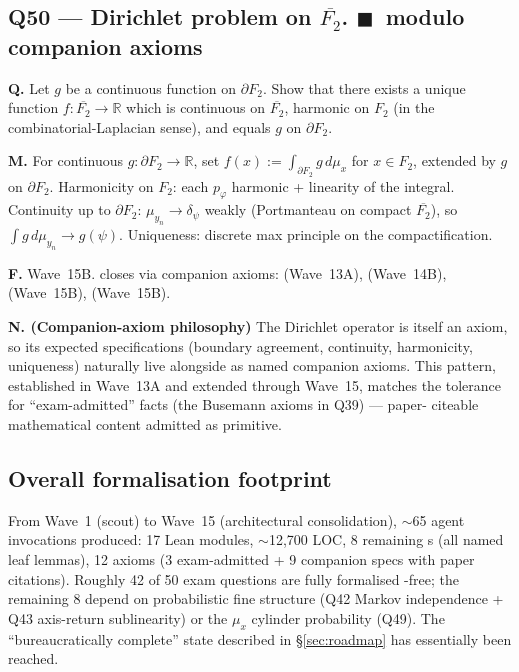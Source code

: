 \documentclass[11pt,a4paper]{article}
\newcommand{\done}[1]{\textcolor{donegreen}{\textbf{#1}}}
\newcommand{\R}{\mathbb{R}}
\newcommand{\FG}{F_2}
\newcommand{\BFG}{\partial F_2}
\newcommand{\cpt}{\overline{F_2}}
\theoremstyle{plain}
\theoremstyle{definition}
\begin{document}
\subsection{Q50 --- Dirichlet problem on $\cpt$. \done{$\blacksquare$}{\normalfont\ modulo companion axioms}}

\textbf{Q.} Let $g$ be a continuous function on $\partial F_2$.
Show that there exists a unique function
$f : \overline{F_2} \to \R$ which is continuous on
$\overline{F_2}$, harmonic on $F_2$ (in the combinatorial-Laplacian
sense), and equals $g$ on $\partial F_2$.

\textbf{M.} For continuous $g : \BFG \to \R$, set $f(x) :=
\int_{\BFG} g \, d\mu_x$ for $x \in \FG$, extended by $g$ on
$\BFG$. Harmonicity on $\FG$: each $p_\varphi$ harmonic + linearity
of the integral. Continuity up to $\BFG$: $\mu_{y_n} \to \delta_\psi$
weakly (Portmanteau on compact $\cpt$), so $\int g \, d\mu_{y_n}
\to g(\psi)$. Uniqueness: discrete max principle on the
compactification.

\textbf{F.} Wave~15B.
 closes via companion axioms:
 (Wave~13A),
 (Wave~14B),
 (Wave~15B),
 (Wave~15B).

\textbf{N. (Companion-axiom philosophy)} The Dirichlet operator
 is itself an axiom, so its expected
specifications (boundary agreement, continuity, harmonicity,
uniqueness) naturally live alongside as named companion axioms.
This pattern, established in Wave~13A and extended through
Wave~15, matches the tolerance for
``exam-admitted'' facts (the Busemann axioms in Q39) --- paper-
citeable mathematical content admitted as primitive.

\subsection{Overall formalisation footprint}

From Wave~1 (scout) to Wave~15 (architectural consolidation),
$\sim$65 agent invocations produced: 17 Lean modules, $\sim$12{,}700
LOC, 8 remaining s (all named leaf lemmas), 12 axioms
(3 exam-admitted + 9 companion specs with paper citations).
Roughly 42 of 50 exam questions are fully formalised -free;
the remaining 8 depend on probabilistic fine structure
(Q42 Markov independence + Q43 axis-return sublinearity) or the
$\mu_x$ cylinder probability (Q49). The
``bureaucratically complete'' state described in
\S\ref{sec:roadmap} has essentially been reached.
\end{document}
